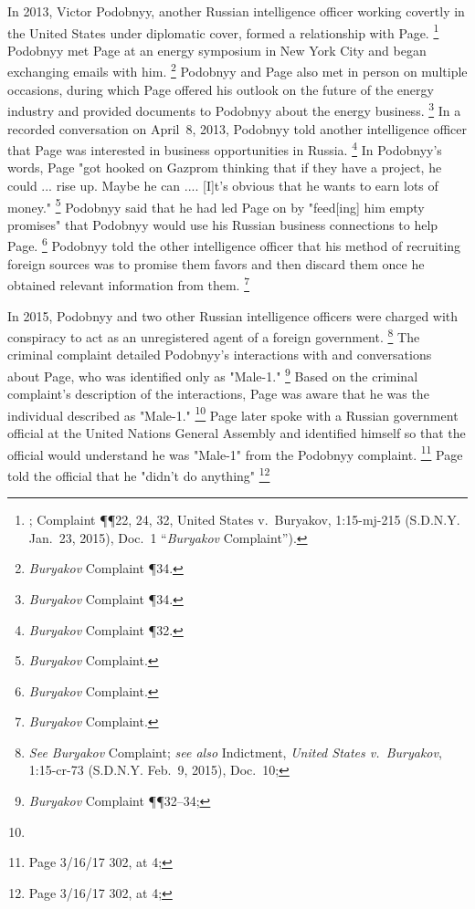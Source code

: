 In 2013, Victor Podobnyy, another Russian intelligence officer working covertly in the United States under diplomatic cover, formed a relationship with Page.%
\footnote{; Complaint \P\P 22, 24, 32, United States v.\ Buryakov, 1:15-mj-215 (S.D.N.Y. Jan.~23, 2015), Doc.~1 “\textit{Buryakov} Complaint”).}
Podobnyy met Page at an energy symposium in New York City and began exchanging emails with him.%
\footnote{\textit{Buryakov} Complaint \P 34.}
Podobnyy and Page also met in person on multiple occasions, during which Page offered his outlook on the future of the energy industry and provided documents to Podobnyy about the energy business.%
\footnote{\textit{Buryakov} Complaint \P 34.}
In a recorded conversation on April~8, 2013, Podobnyy told another intelligence officer that Page was interested in business opportunities in Russia.%
\footnote{\textit{Buryakov} Complaint \P 32.}
In Podobnyy's words, Page "got hooked on Gazprom thinking that if they have a project, he could ... rise up. Maybe he can .... [I]t's obvious that he wants to earn lots of money."%
\footnote{\textit{Buryakov} Complaint.}
Podobnyy said that he had led Page on by "feed[ing] him empty promises" that Podobnyy would use his Russian business connections to help Page.%
\footnote{\textit{Buryakov} Complaint.}
Podobnyy told the other intelligence officer that his method of recruiting foreign sources was to promise them favors and then discard them once he obtained relevant information from them.%
\footnote{\textit{Buryakov} Complaint.}

In 2015, Podobnyy and two other Russian intelligence officers were charged with conspiracy to act as an unregistered agent of a foreign government.%
\footnote{\textit{See Buryakov} Complaint;
\textit{see also} Indictment, \textit{United States v.\ Buryakov}, 1:15-cr-73 (S.D.N.Y. Feb.~9, 2015), Doc.~10;
}
The criminal complaint detailed Podobnyy's interactions with and conversations about Page, who was identified only as "Male-1."%
\footnote{\textit{Buryakov} Complaint \P\P 32--34; }
Based on the criminal complaint's description of the interactions, Page was aware that he was the individual described as "Male-1."%
\footnote{}
Page later spoke with a Russian government official at the United Nations General Assembly and identified himself so that the official would understand he was "Male-1" from the Podobnyy complaint. %
\footnote{Page 3/16/17 302, at 4; }
Page told the official that he "didn't do anything"
\footnote{Page 3/16/17 302, at 4; }

